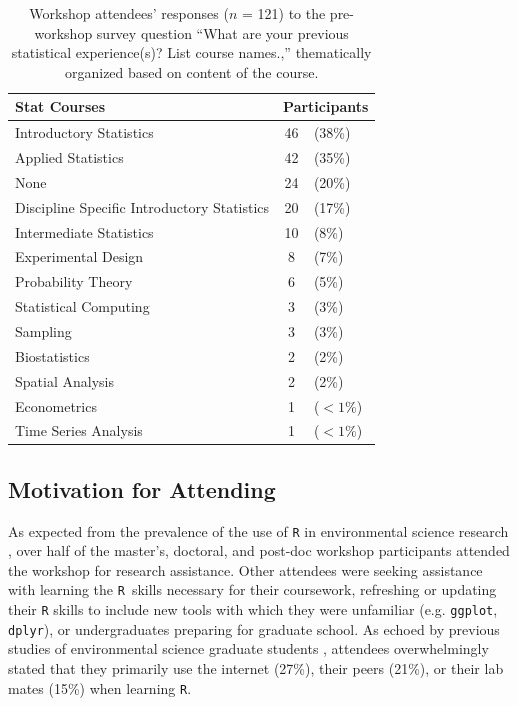 \documentclass[12pt]{article}
\newcommand{\R}{\texttt{R}}
\begin{document}
{
\begin{table}[h!]
    \centering
    \begin{tabular}{lcl}
\hline
Stat Courses & \multicolumn{2}{c}{Participants} \\
\hline
Introductory Statistics & 46 & (38\%) \\
Applied Statistics & 42 & (35\%) \\
None & 24 & (20\%) \\
Discipline Specific Introductory Statistics & 20 & (17\%)\\
Intermediate Statistics & 10 & (8\%)\\
Experimental Design	& 8 & (7\%)\\
Probability Theory	& 6 & (5\%) \\
Statistical Computing & 3 & (3\%)\\
Sampling & 3 & (3\%)\\
Biostatistics & 2 & (2\%) \\
Spatial Analysis & 2 & (2\%)\\
Econometrics & 1 & ($<1$\%)\\
Time Series Analysis & 1&  ($<1$\%)\\
\hline
\end{tabular}
\caption{Workshop attendees' responses ($n$ = 121) to the pre-workshop survey
question ``What are your previous statistical experience(s)?  List course
names.,'' thematically organized based on content of the course.}
\label{tab:statistics}
\end{table}
}

\subsection{Motivation for Attending} 

\noindent As expected from the prevalence of the use of \texttt{R} in environmental
science research \citep{Rpopular, mislan}, over half of the master's, doctoral, 
and post-doc workshop participants attended the workshop for research
assistance. Other attendees were seeking assistance with learning the \R~skills
necessary for their coursework, refreshing or updating their \texttt{R}
skills to include new tools with which they were unfamiliar (e.g. \texttt{ggplot}, 
\texttt{dplyr}), or undergraduates preparing for graduate school. As echoed by
previous studies of environmental science graduate students \citep{carpentry,
theobold}, attendees overwhelmingly stated that they primarily use the internet
(27\%), their peers (21\%), or their lab mates (15\%) when learning \texttt{R}.
\end{document}
